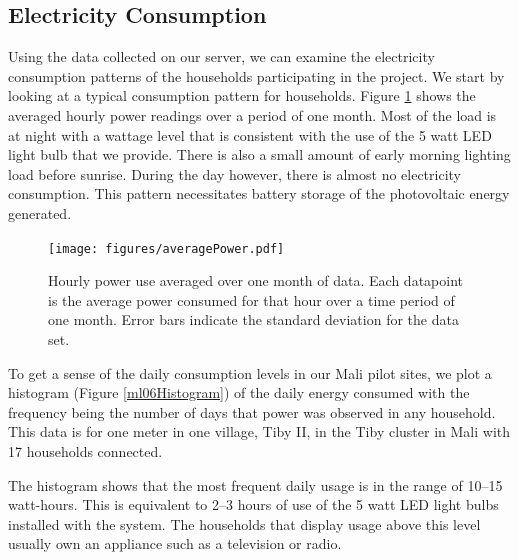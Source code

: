 \documentclass{sig-alternate}
\newcommand{\note}[1]{{\color{red} NOTE: *** #1 ***}}
\begin{document}
\subsection{Electricity Consumption}
Using the data collected on our server, we can examine the electricity
consumption patterns of the households participating in the project.
We start by looking at a typical consumption pattern for households.
Figure \ref{averagedAccumulatedEnergy} shows the averaged
hourly power readings over a period of one month.
Most of the load is at night with a wattage level that is consistent
with the use of the 5 watt LED light bulb that we provide.
There is also a small amount of early morning lighting load before sunrise.
During the day however, there is almost no electricity consumption.
This pattern necessitates battery storage of the photovoltaic energy
generated.

\begin{figure}[]
\begin{center}
\texttt{[image: figures/averagePower.pdf]}
\end{center}
\caption{Hourly power use averaged over one month of data.  Each datapoint is the
average power consumed for that hour over a time period of one month.  Error bars
indicate the standard deviation for the data set.}
\label{averagedAccumulatedEnergy}
\end{figure}

To get a sense of the daily consumption levels in our Mali pilot sites,
we plot a histogram (Figure \ref{ml06Histogram}) of the daily
energy consumed with the frequency being
the number of days that power was observed in any household.
This data is for one meter in one village, Tiby II, in the Tiby cluster
in Mali with 17 households connected.

The histogram shows that the most frequent
daily usage is in the range of 10--15 watt-hours.
This is equivalent to 2--3 hours of use of the 5 watt LED
light bulbs installed with the system.
The households that display usage above this level usually own an appliance
such as a television or radio.
\end{document}
